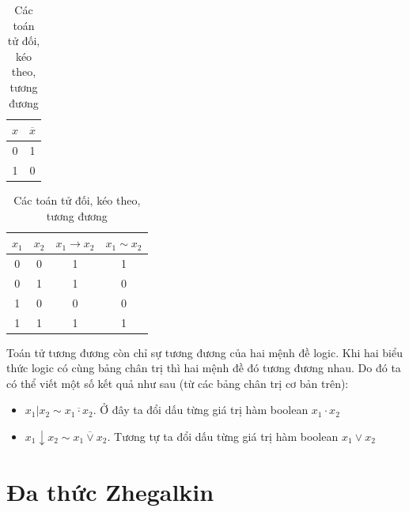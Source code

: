 \begin{table}[ht]
    \begin{subtable}[t]{0.25\textwidth}
        \centering
        \begin{tabular}{|c|c|}
            \hline
            $x$ & $\overline{x}$ \\
            \hline
            0 & 1 \\
            \hline
            1 & 0 \\
            \hline
        \end{tabular}
        \caption{Toán tử đối}
    \end{subtable}
    \hspace{\fill}
    \begin{subtable}[t]{0.55\textwidth}
        \centering
        \begin{tabular}{|c|c|c|c|}
            \hline
            $x_1$ & $x_2$ & $x_1 \rightarrow x_2$ & $x_1 \sim x_2$ \\
            \hline
            0 & 0 & 1 & 1 \\
            \hline
            0 & 1 & 1 & 0 \\
            \hline
            1 & 0 & 0 & 0 \\
            \hline
            1 & 1 & 1 & 1 \\
            \hline
        \end{tabular}
        \caption{Toán tử kéo theo và tương đương}
    \end{subtable}
    \caption{Các toán tử đối, kéo theo, tương đương}
\end{table}

Toán tử tương đương còn chỉ sự tương đương của hai mệnh đề logic.
Khi hai biểu thức logic có cùng bảng chân trị thì hai mệnh đề đó
tương đương nhau. Do đó ta có thể viết một số kết quả như sau (từ
các bảng chân trị cơ bản trên):

\begin{itemize}
    \item $x_1 \vert x_2 \sim \overline{x_1 \cdot x_2}$. Ở đây
        ta đổi dấu từng giá trị hàm boolean $x_1 \cdot x_2$
    \item $x_1 \downarrow x_2 \sim \overline{x_1 \vee x_2}$. 
        Tương tự ta đổi dấu từng giá trị hàm boolean $x_1 \vee x_2$
\end{itemize}

\section{Đa thức Zhegalkin}

